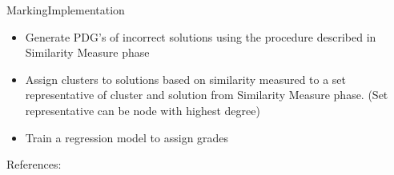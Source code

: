 \documentclass{beamer}
\begin{document}
\begin{frame}{Marking}{Implementation}
     \begin{itemize}
         \item  Generate PDG's of incorrect solutions using the procedure described in Similarity Measure phase
         \item   Assign clusters to solutions based on similarity measured to a set representative of cluster and solution from Similarity Measure phase. (Set representative can be node with highest degree)
         \item  Train a regression model to assign grades
     \end{itemize}
\end{frame}



\begin{frame}{References:}
    
\printbibliography

\end{frame}
\end{document}
